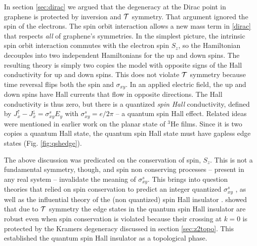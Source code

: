 \documentclass[twocolumn,floatfix,showpacs,rmp,aps]{revtex4}
\begin{document}
	In section \ref{sec:dirac} we argued that the degeneracy at the Dirac
	point in graphene is protected by inversion and ${\cal T}$
	symmetry.  That argument ignored the spin of the
	electrons.  The spin orbit interaction allows a new mass
	term in \eqref{dirac} that respects {\it all} of graphene's
	symmetries.
	In the simplest picture, the intrinsic spin orbit interaction
	commutes with the electron spin $S_z$, so the Hamiltonian decouples
	into two independent Hamiltonians for the up and down spins.  The
	resulting theory is simply two copies the \textcite{haldane88} model
	with opposite signs of the Hall conductivity for up and down spins.
	This does not violate ${\cal T}$ symmetry because time reversal
	flips both the spin and $\sigma_{xy}$.  In an applied
	electric field, the up and down spins have Hall currents that flow in
	opposite directions.  The Hall conductivity is thus zero, but there
	is a quantized {\it spin Hall} conductivity, defined by
	$J_x^\uparrow-J_x^\downarrow = \sigma_{xy}^s E_y$ with
	$\sigma_{xy}^s = e/2\pi$ --
	a quantum spin Hall effect.  Related ideas were mentioned in
	earlier work on the planar state of $^3$He films\cite{volovik89}.
	Since it is two copies a quantum Hall state, the quantum
	spin Hall state must have gapless edge states (Fig. \ref{fig:qshedge}).
	
	The above discussion was predicated on the conservation of
	spin, $S_z$.  This is not a fundamental symmetry, though, and spin
	non conserving processes -- present in any real system -- invalidate the
	meaning of $\sigma_{xy}^s$.  This brings into
	question theories that relied on spin conservation to predict an
	integer quantized $\sigma_{xy}^s$ \cite{volovik89,bernevig06,qi06}, as well as the
	influential theory of the (non quantized) spin Hall insulator \cite{murakami04}.
	\textcite{kanemele05a} showed that due to ${\cal T}$ symmetry
	the edge states in the quantum spin Hall insulator are robust
	even when spin conservation is violated because their crossing at $k=0$ is
	protected by the Kramers degeneracy discussed in section
	\ref{sec:z2topo}.  This established the quantum spin Hall insulator as a
	topological phase.
	
\end{document}
